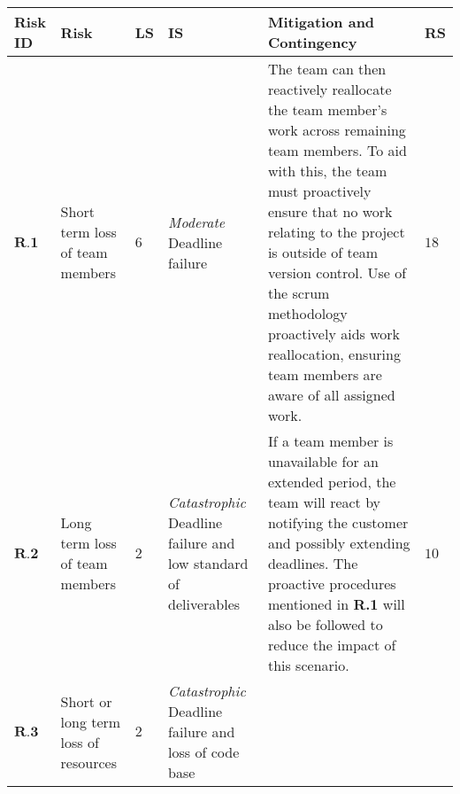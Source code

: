 \begin{longtable}[H]{| p{0.6cm} | p{2cm} | p{0.3cm} | p{2.6cm} | p{8.1cm} | p{0.7cm} |}
    \hline
    \cellcolor{titleColor}\textbf{Risk ID}   & \cellcolor{titleColor}\textbf{Risk}                                             &\cellcolor{titleColor}\textbf{LS}        & \cellcolor{titleColor}\textbf{IS}                                 & \cellcolor{titleColor}\textbf{Mitigation and Contingency} & \cellcolor{titleColor}\textbf{RS} \\ \hline                                                                                                                                                                                                                                                                                                                                                                                                                                                                          
    $\textbf{R.1}$   & Short term loss of team members                  & $6$       & \textit{Moderate}
\newline Deadline failure                                        
      &  The team can then reactively reallocate the team member's work across remaining team members. To aid with this, the team must proactively ensure that no work relating to the project is outside of team version control. Use of the scrum methodology proactively aids work reallocation, ensuring team members are aware of all assigned work. 
      & $18$    \\ \hline
    $\textbf{R.2}$    & Long term loss of team members                   & $2$ & \textit{Catastrophic}
\newline Deadline failure and low standard of deliverables 
    & If a team member is unavailable for an extended period, the team will react by notifying the customer and possibly extending deadlines. The proactive procedures mentioned in \textbf{R.1} will also be followed to reduce the impact of this scenario.                                                                                                                                                                                                                                                                                            
    & $10$    \\ \hline
    $\textbf{R.3}$     & Short or long term loss of resources             & $2$ & \textit{Catastrophic}
\newline Deadline failure and loss of code base              

\end{longtable}
